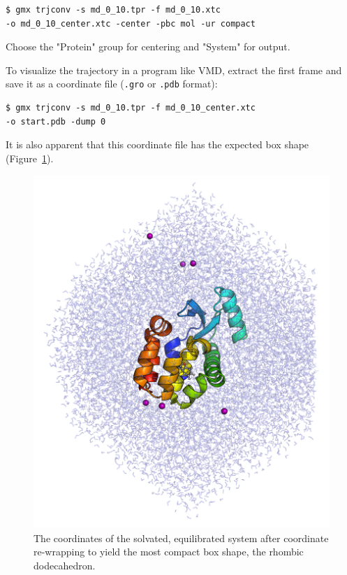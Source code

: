 \documentclass[9pt,tutorial]{livecoms}
\begin{document}
\begin{verbatim}
$ gmx trjconv -s md_0_10.tpr -f md_0_10.xtc
-o md_0_10_center.xtc -center -pbc mol -ur compact
\end{verbatim}

Choose the "Protein" group for centering  and "System" for output.

To visualize the trajectory in a program like VMD, extract the first frame and save it as a coordinate file (\texttt{.gro} or \texttt{.pdb} format):

\begin{verbatim}
$ gmx trjconv -s md_0_10.tpr -f md_0_10_center.xtc
-o start.pdb -dump 0
\end{verbatim}

It is also apparent that this coordinate file has the expected box shape (Figure~\ref{3htb_t0_rewrap_fig}).

\begin{figure}[h!]
\centering
\includegraphics{3htb_t0_rewrap}
\caption{The coordinates of the solvated, equilibrated system after coordinate re-wrapping to yield the most compact box shape, the rhombic dodecahedron.}
\label{3htb_t0_rewrap_fig}
\end{figure}
\end{document}
